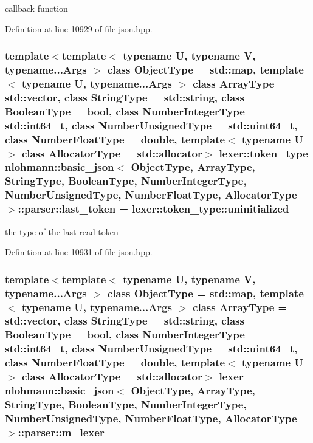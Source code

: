 callback function 



Definition at line 10929 of file json.\+hpp.

\hypertarget{classnlohmann_1_1basic__json_1_1parser_adfb1017b95ae14e52c585e1296e8faac}{}
\subsubsection[{last\+\_\+token}]{\setlength{\rightskip}{0pt plus 5cm}template$<$template$<$ typename U, typename V, typename...\+Args $>$ class Object\+Type = std\+::map, template$<$ typename U, typename...\+Args $>$ class Array\+Type = std\+::vector, class String\+Type  = std\+::string, class Boolean\+Type  = bool, class Number\+Integer\+Type  = std\+::int64\+\_\+t, class Number\+Unsigned\+Type  = std\+::uint64\+\_\+t, class Number\+Float\+Type  = double, template$<$ typename U $>$ class Allocator\+Type = std\+::allocator$>$ {\bf lexer\+::token\+\_\+type} {\bf nlohmann\+::basic\+\_\+json}$<$ Object\+Type, Array\+Type, String\+Type, Boolean\+Type, Number\+Integer\+Type, Number\+Unsigned\+Type, Number\+Float\+Type, Allocator\+Type $>$\+::parser\+::last\+\_\+token = {\bf lexer\+::token\+\_\+type\+::uninitialized}\hspace{0.3cm}{\ttfamily [private]}}\label{classnlohmann_1_1basic__json_1_1parser_adfb1017b95ae14e52c585e1296e8faac}


the type of the last read token 



Definition at line 10931 of file json.\+hpp.

\hypertarget{classnlohmann_1_1basic__json_1_1parser_ae07b3100692718072e199c6e2a8e1e1b}{}
\subsubsection[{m\+\_\+lexer}]{\setlength{\rightskip}{0pt plus 5cm}template$<$template$<$ typename U, typename V, typename...\+Args $>$ class Object\+Type = std\+::map, template$<$ typename U, typename...\+Args $>$ class Array\+Type = std\+::vector, class String\+Type  = std\+::string, class Boolean\+Type  = bool, class Number\+Integer\+Type  = std\+::int64\+\_\+t, class Number\+Unsigned\+Type  = std\+::uint64\+\_\+t, class Number\+Float\+Type  = double, template$<$ typename U $>$ class Allocator\+Type = std\+::allocator$>$ {\bf lexer} {\bf nlohmann\+::basic\+\_\+json}$<$ Object\+Type, Array\+Type, String\+Type, Boolean\+Type, Number\+Integer\+Type, Number\+Unsigned\+Type, Number\+Float\+Type, Allocator\+Type $>$\+::parser\+::m\+\_\+lexer\hspace{0.3cm}{\ttfamily [private]}}\label{classnlohmann_1_1basic__json_1_1parser_ae07b3100692718072e199c6e2a8e1e1b}


